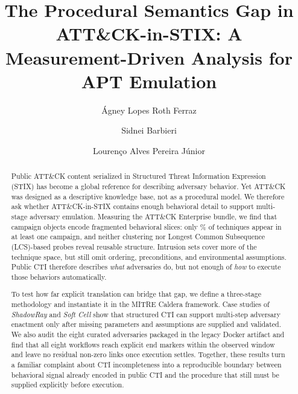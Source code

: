 \documentclass[sigconf]{acmart}
\newcommand{\stix}{STIX\xspace}
\newcommand{\mitre}{MITRE\xspace}
\newcommand{\attack}{ATT\&CK\xspace}
\newcommand{\caldera}{Caldera\xspace}
\begin{document}
\title{The Procedural Semantics Gap in ATT\&CK-in-STIX: A Measurement-Driven Analysis for APT Emulation}
\author{Ágney Lopes Roth Ferraz}

\author{Sidnei Barbieri}
\authornotemark[1]

\author{Lourenço Alves Pereira Júnior}

\renewcommand{\shortauthors}{Ferraz et al.}

\begin{abstract}

Public \attack{} content serialized in Structured Threat Information Expression (\stix{}) has become a global reference for describing adversary behavior. Yet \attack{} was designed as a descriptive knowledge base, not as a procedural model. We therefore ask whether \attack{}-in-\stix{} contains enough behavioral detail to support multi-stage adversary emulation. Measuring the \attack{} Enterprise bundle, we find that campaign objects encode fragmented behavioral slices: only \campaignCoveragePct\% of techniques appear in at least one campaign, and neither clustering nor Longest Common Subsequence (LCS)-based probes reveal reusable structure. Intrusion sets cover more of the technique space, but still omit ordering, preconditions, and environmental assumptions. Public CTI therefore describes \emph{what} adversaries do, but not enough of \emph{how} to execute those behaviors automatically.

To test how far explicit translation can bridge that gap, we define a three-stage methodology and instantiate it in the \mitre{} \caldera{} framework. Case studies of \emph{ShadowRay} and \emph{Soft Cell} show that structured CTI can support multi-step adversary enactment only after missing parameters and assumptions are supplied and validated. We also audit the eight curated adversaries packaged in the legacy Docker artifact and find that all eight workflows reach explicit end markers within the observed window and leave no residual non-zero links once execution settles. Together, these results turn a familiar complaint about CTI incompleteness into a reproducible boundary between behavioral signal already encoded in public CTI and the procedure that still must be supplied explicitly before execution.
\end{abstract}
\end{document}
